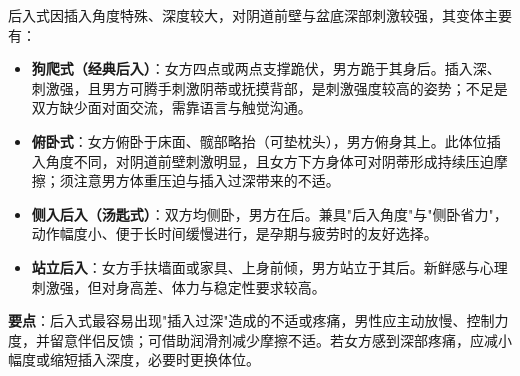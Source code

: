 后入式因插入角度特殊、深度较大，对阴道前壁与盆底深部刺激较强，其变体主要有：

\begin{itemize}
	\item \textbf{狗爬式（经典后入）}：女方四点或两点支撑跪伏，男方跪于其身后。插入深、刺激强，且男方可腾手刺激阴蒂或抚摸背部，是刺激强度较高的姿势；不足是双方缺少面对面交流，需靠语言与触觉沟通。
	\item \textbf{俯卧式}：女方俯卧于床面、髋部略抬（可垫枕头），男方俯身其上。此体位插入角度不同，对阴道前壁刺激明显，且女方下方身体可对阴蒂形成持续压迫摩擦；须注意男方体重压迫与插入过深带来的不适。
	\item \textbf{侧入后入（汤匙式）}：双方均侧卧，男方在后。兼具"后入角度"与"侧卧省力"，动作幅度小、便于长时间缓慢进行，是孕期与疲劳时的友好选择。
	\item \textbf{站立后入}：女方手扶墙面或家具、上身前倾，男方站立于其后。新鲜感与心理刺激强，但对身高差、体力与稳定性要求较高。
\end{itemize}

\noindent\textbf{要点}：后入式最容易出现"插入过深"造成的不适或疼痛，男性应主动放慢、控制力度，并留意伴侣反馈；可借助润滑剂减少摩擦不适。若女方感到深部疼痛，应减小幅度或缩短插入深度，必要时更换体位。
